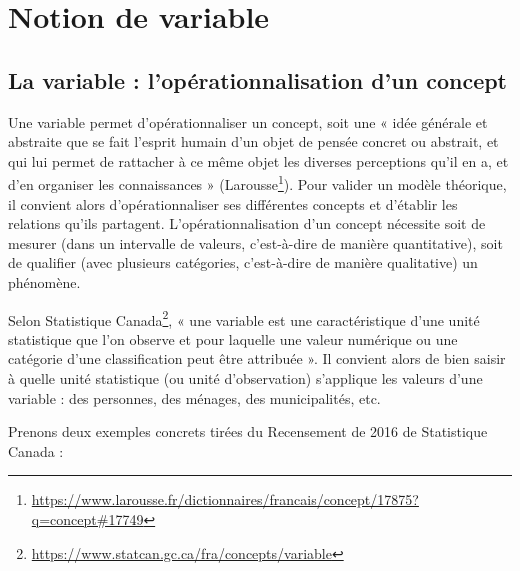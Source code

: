 \documentclass[
  11pt,
  french,
]{book}
\renewcommand{\href}[2]{#2\footnote{\url{#1}}}
\begin{document}
\hypertarget{sect021}{%
\section{Notion de variable}\label{sect021}}

\hypertarget{sect0211}{%
\subsection{La variable : l'opérationnalisation d'un concept}\label{sect0211}}

Une variable permet d'opérationnaliser un concept, soit une « idée générale et abstraite que se fait l'esprit humain d'un objet de pensée concret ou abstrait, et qui lui permet de rattacher à ce même objet les diverses perceptions qu'il en a, et d'en organiser les connaissances » (\href{https://www.larousse.fr/dictionnaires/francais/concept/17875?q=concept\#17749}{Larousse}). Pour valider un modèle théorique, il convient alors d'opérationnaliser ses différentes concepts et d'établir les relations qu'ils partagent. L'opérationnalisation d'un concept nécessite soit de mesurer (dans un intervalle de valeurs, c'est-à-dire de manière quantitative), soit de qualifier (avec plusieurs catégories, c'est-à-dire de manière qualitative) un phénomène.

Selon \href{https://www.statcan.gc.ca/fra/concepts/variable}{Statistique Canada}, « une variable est une caractéristique d'une unité statistique que l'on observe et pour laquelle une valeur numérique ou une catégorie d'une classification peut être attribuée ». Il convient alors de bien saisir à quelle unité statistique (ou unité d'observation) s'applique les valeurs d'une variable : des personnes, des ménages, des municipalités, etc.

Prenons deux exemples concrets tirées du Recensement de 2016 de Statistique Canada :
\end{document}
